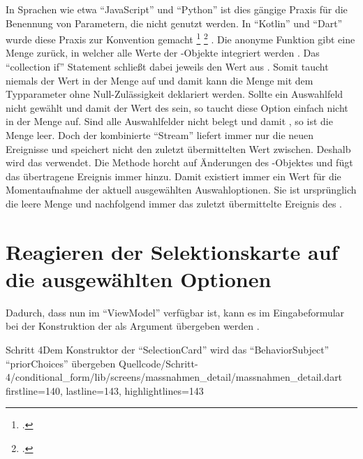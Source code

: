 In Sprachen wie etwa \enquote{JavaScript} und \enquote{Python} ist dies gängige Praxis für die Benennung von Parametern,
die nicht genutzt werden.
In \enquote{Kotlin} und \enquote{Dart} wurde diese Praxis zur Konvention gemacht
\footcite[Vgl.][]{DartEffectiveDartStylePREFERusingUnderscore}
\footcite[Vgl.][]{KotlinHighOrderFunctionsAndLambdasUnderscoreForUnusedVariables}
. 
Die anonyme Funktion gibt eine Menge zurück,
in welcher alle Werte der -Objekte integriert werden .
Das \enquote{collection if} Statement schließt dabei jeweils den Wert  aus .
Somit taucht niemals der Wert  in der Menge auf und damit kann die Menge mit dem Typparameter  ohne Null-Zulässigkeit deklariert werden.
Sollte ein Auswahlfeld nicht gewählt und damit der Wert des   sein,
so taucht diese Option einfach nicht in der Menge auf.
Sind alle Auswahlfelder nicht belegt und damit ,
so ist die Menge leer.
Doch der kombinierte \enquote{Stream}  liefert immer nur die neuen Ereignisse und speichert nicht den zuletzt übermittelten Wert zwischen.
Deshalb wird das   verwendet.
Die Methode  horcht auf Änderungen des -Objektes und fügt das übertragene Ereignis immer  hinzu. 
Damit existiert immer ein Wert für die Momentaufnahme der aktuell ausgewählten Auswahloptionen.
Sie ist ursprünglich die leere Menge \IC{{}} und nachfolgend immer das zuletzt übermittelte Ereignis des .

\section{Reagieren der Selektionskarte auf die ausgewählten Optionen}

Dadurch,
dass  nun im \enquote{ViewModel} verfügbar ist,
kann es im Eingabeformular bei der Konstruktion der  als Argument übergeben werden .

\begin{alexlisting}{Schritt 4}{Dem Konstruktor der \enquote{SelectionCard} wird das \enquote{BehaviorSubject} \enquote{priorChoices} übergeben}
  {Quellcode/Schritt-4/conditional_form/lib/screens/massnahmen_detail/massnahmen_detail.dart}
  {firstline=140, lastline=143, highlightlines={143}}
  \label{lst:Schritt4builderSelectionCard}
\end{alexlisting}

